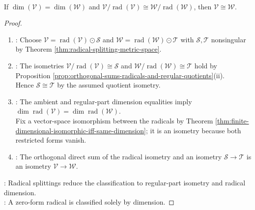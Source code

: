 \begin{corollary} \label{cor:metric-spaces-determined-by-regular-quotient-and-dimension} \\
If $\dim(\mathcal{V})=\dim(\mathcal{W})$ and $\mathcal{V}/\operatorname{rad}(\mathcal{V})\cong\mathcal{W}/\operatorname{rad}(\mathcal{W})$, then $\mathcal{V}\cong\mathcal{W}$.
\begin{proof}
\begin{enumerate}[label=(\roman*)]
\setlength{\itemsep}{0pt}
\item {}: Choose $\mathcal{V}=\operatorname{rad}(\mathcal{V})\odot\mathcal{S}$ and $\mathcal{W}=\operatorname{rad}(\mathcal{W})\odot\mathcal{T}$ with $\mathcal{S},\mathcal{T}$ nonsingular by Theorem \ref{thm:radical-splitting-metric-space}.
\item {}: The isometries $\mathcal{V}/\operatorname{rad}(\mathcal{V})\cong\mathcal{S}$ and $\mathcal{W}/\operatorname{rad}(\mathcal{W})\cong\mathcal{T}$ hold by Proposition \ref{prop:orthogonal-sums-radicals-and-regular-quotients}(ii).\\
Hence $\mathcal{S}\cong\mathcal{T}$ by the assumed quotient isometry.
\item {}: The ambient and regular-part dimension equalities imply $\dim\operatorname{rad}(\mathcal{V})=\dim\operatorname{rad}(\mathcal{W})$.\\
Fix a vector-space isomorphism between the radicals by Theorem \ref{thm:finite-dimensional-isomorphic-iff-same-dimension}; it is an isometry because both restricted forms vanish.
\item {}: The orthogonal direct sum of the radical isometry and an isometry $\mathcal{S}\to\mathcal{T}$ is an isometry $\mathcal{V}\to\mathcal{W}$.
\end{enumerate}
: Radical splittings reduce the classification to regular-part isometry and radical dimension.\\
: A zero-form radical is classified solely by dimension.
\end{proof}
\end{corollary}

